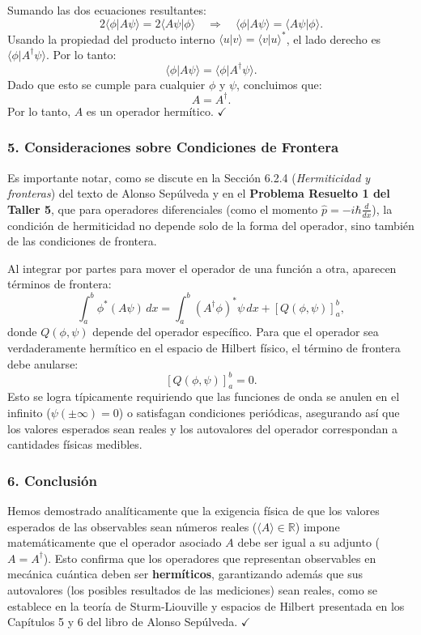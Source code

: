 \documentclass[a4paper]{article}
\begin{document}
    Sumando las dos ecuaciones resultantes:
    $$
    2 \langle \phi | A \psi \rangle = 2 \langle A \psi | \phi \rangle \quad \Rightarrow \quad \langle \phi | A \psi \rangle = \langle A \psi | \phi \rangle.
    $$
    Usando la propiedad del producto interno $\langle u | v \rangle = \langle v | u \rangle^*$, el lado derecho es $\langle \phi | A^\dagger \psi \rangle$. Por lo tanto:
    $$
    \langle \phi | A \psi \rangle = \langle \phi | A^\dagger \psi \rangle.
    $$
    Dado que esto se cumple para cualquier $\phi$ y $\psi$, concluimos que:
    $$
    A = A^\dagger.
    $$
    Por lo tanto, $A$ es un operador hermítico. $\checkmark$

\subsubsection{5. Consideraciones sobre Condiciones de Frontera}

Es importante notar, como se discute en la Sección 6.2.4 (\textit{Hermiticidad y fronteras}) del texto de Alonso Sepúlveda y en el \textbf{Problema Resuelto 1 del Taller 5}, que para operadores diferenciales (como el momento $\hat{p} = -i\hbar \frac{d}{dx}$), la condición de hermiticidad no depende solo de la forma del operador, sino también de las condiciones de frontera.

Al integrar por partes para mover el operador de una función a otra, aparecen términos de frontera:
$$
\int_a^b \phi^* (A \psi) \, dx = \int_a^b (A^\dagger \phi)^* \psi \, dx + \left[ Q(\phi, \psi) \right]_a^b,
$$
donde $Q(\phi, \psi)$ depende del operador específico. Para que el operador sea verdaderamente hermítico en el espacio de Hilbert físico, el término de frontera debe anularse:
$$
\left[ Q(\phi, \psi) \right]_a^b = 0.
$$
Esto se logra típicamente requiriendo que las funciones de onda se anulen en el infinito ($\psi(\pm \infty) = 0$) o satisfagan condiciones periódicas, asegurando así que los valores esperados sean reales y los autovalores del operador correspondan a cantidades físicas medibles.

\subsubsection{6. Conclusión}

Hemos demostrado analíticamente que la exigencia física de que los valores esperados de las observables sean números reales ($\langle A \rangle \in \mathbb{R}$) impone matemáticamente que el operador asociado $A$ debe ser igual a su adjunto ($A = A^\dagger$). Esto confirma que los operadores que representan observables en mecánica cuántica deben ser \textbf{hermíticos}, garantizando además que sus autovalores (los posibles resultados de las mediciones) sean reales, como se establece en la teoría de Sturm-Liouville y espacios de Hilbert presentada en los Capítulos 5 y 6 del libro de Alonso Sepúlveda. $\checkmark$
\end{document}
